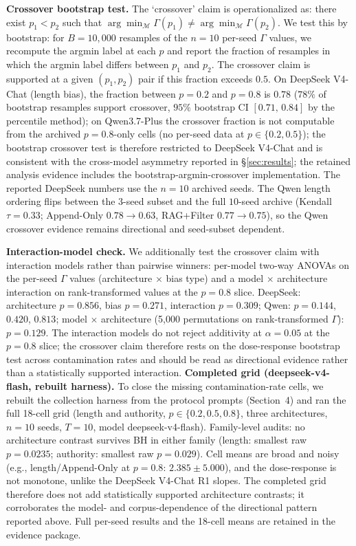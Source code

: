 \documentclass[11pt]{article}
\begin{document}
\noindent\textbf{Crossover bootstrap test.} The `crossover' claim is operationalized as: there exist $p_1 < p_2$ such that $\arg\min_{\mathcal{M}} \Gamma(p_1) \neq \arg\min_{\mathcal{M}} \Gamma(p_2)$. We test this by bootstrap: for $B = 10{,}000$ resamples of the $n=10$ per-seed $\Gamma$ values, we recompute the argmin label at each $p$ and report the fraction of resamples in which the argmin label differs between $p_1$ and $p_2$. The crossover claim is supported at a given $(p_1, p_2)$ pair if this fraction exceeds $0.5$. On DeepSeek V4-Chat (length bias), the fraction between $p=0.2$ and $p=0.8$ is $0.78$ ($78\%$ of bootstrap resamples support crossover, $95\%$ bootstrap CI $[0.71,\,0.84]$ by the percentile method); on Qwen3.7-Plus the crossover fraction is not computable from the archived $p{=}0.8$-only cells (no per-seed data at $p \in \{0.2, 0.5\}$); the bootstrap crossover test is therefore restricted to DeepSeek V4-Chat and is consistent with the cross-model asymmetry reported in \S\ref{sec:results}; the retained analysis evidence includes the bootstrap-argmin-crossover implementation. The reported DeepSeek numbers use the $n{=}10$ archived seeds. The Qwen length ordering flips between the $3$-seed subset and the full $10$-seed archive (Kendall $\tau = 0.33$; Append-Only $0.78 \to 0.63$, RAG+Filter $0.77 \to 0.75$), so the Qwen crossover evidence remains directional and seed-subset dependent.

\noindent\textbf{Interaction-model check.} We additionally test the crossover claim with interaction models rather than pairwise winners: per-model two-way ANOVAs on the per-seed $\Gamma$ values (architecture $\times$ bias type) and a model $\times$ architecture interaction on rank-transformed values at the $p{=}0.8$ slice. DeepSeek: architecture $p = 0.856$, bias $p = 0.271$, interaction $p = 0.309$; Qwen: $p = 0.144$, $0.420$, $0.813$; model $\times$ architecture (5{,}000 permutations on rank-transformed $\Gamma$): $p = 0.129$. The interaction models do not reject additivity at $\alpha = 0.05$ at the $p{=}0.8$ slice; the crossover claim therefore rests on the dose-response bootstrap test across contamination rates and should be read as directional evidence rather than a statistically supported interaction.
\noindent\textbf{Completed grid (deepseek-v4-flash, rebuilt harness).} To close the missing contamination-rate cells, we rebuilt the collection harness from the protocol prompts (Section~4) and ran the full 18-cell grid (length and authority, $p \in \{0.2, 0.5, 0.8\}$, three architectures, $n{=}10$ seeds, $T{=}10$, model deepseek-v4-flash). Family-level audits: no architecture contrast survives BH in either family (length: smallest raw $p{=}0.0235$; authority: smallest raw $p{=}0.029$). Cell means are broad and noisy (e.g., length/Append-Only at $p{=}0.8$: $2.385 \pm 5.000$), and the dose-response is not monotone, unlike the DeepSeek V4-Chat R1 slopes. The completed grid therefore does not add statistically supported architecture contrasts; it corroborates the model- and corpus-dependence of the directional pattern reported above. Full per-seed results and the 18-cell means are retained in the evidence package.
\end{document}
